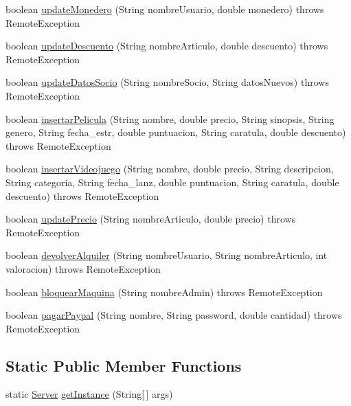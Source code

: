 \begin{DoxyCompactItemize}
\item 
boolean \mbox{\hyperlink{classes_1_1deusto_1_1server_1_1remote_1_1_server_af6936fcce306cd9c8881f81375631a46}{update\+Monedero}} (String nombre\+Usuario, double monedero)  throws Remote\+Exception 
\item 
boolean \mbox{\hyperlink{classes_1_1deusto_1_1server_1_1remote_1_1_server_a376610f3c51b4e545c1618f5e0f32171}{update\+Descuento}} (String nombre\+Articulo, double descuento)  throws Remote\+Exception 
\item 
boolean \mbox{\hyperlink{classes_1_1deusto_1_1server_1_1remote_1_1_server_a3e84eab9962a99fa99c02de1000a102a}{update\+Datos\+Socio}} (String nombre\+Socio, String datos\+Nuevos)  throws Remote\+Exception 
\item 
boolean \mbox{\hyperlink{classes_1_1deusto_1_1server_1_1remote_1_1_server_a826b0343cb4dd20617cb7ee299de4171}{insertar\+Pelicula}} (String nombre, double precio, String sinopsis, String genero, String fecha\+\_\+estr, double puntuacion, String caratula, double descuento)  throws Remote\+Exception 
\item 
boolean \mbox{\hyperlink{classes_1_1deusto_1_1server_1_1remote_1_1_server_a406e093c958d4b85be33d55f79b9879e}{insertar\+Videojuego}} (String nombre, double precio, String descripcion, String categoria, String fecha\+\_\+lanz, double puntuacion, String caratula, double descuento)  throws Remote\+Exception 
\item 
boolean \mbox{\hyperlink{classes_1_1deusto_1_1server_1_1remote_1_1_server_a48e59414c1c8e7b69f7f795b61bd5311}{update\+Precio}} (String nombre\+Articulo, double precio)  throws Remote\+Exception 
\item 
boolean \mbox{\hyperlink{classes_1_1deusto_1_1server_1_1remote_1_1_server_a980cae19c411c05bc1d1b9ec93e0083a}{devolver\+Alquiler}} (String nombre\+Usuario, String nombre\+Articulo, int valoracion)  throws Remote\+Exception 
\item 
boolean \mbox{\hyperlink{classes_1_1deusto_1_1server_1_1remote_1_1_server_ae03d92a9f36e32fe68553bfc8506efec}{bloquear\+Maquina}} (String nombre\+Admin)  throws Remote\+Exception 
\item 
boolean \mbox{\hyperlink{classes_1_1deusto_1_1server_1_1remote_1_1_server_a31c17e7534d892c61a2ac36c87e08dbc}{pagar\+Paypal}} (String nombre, String password, double cantidad)  throws Remote\+Exception 
\end{DoxyCompactItemize}
\subsection*{Static Public Member Functions}
\begin{DoxyCompactItemize}
\item 
static \mbox{\hyperlink{classes_1_1deusto_1_1server_1_1remote_1_1_server}{Server}} \mbox{\hyperlink{classes_1_1deusto_1_1server_1_1remote_1_1_server_a030f63775beb7b2d6a60d7626af45764}{get\+Instance}} (String\mbox{[}$\,$\mbox{]} args)
\end{DoxyCompactItemize}



